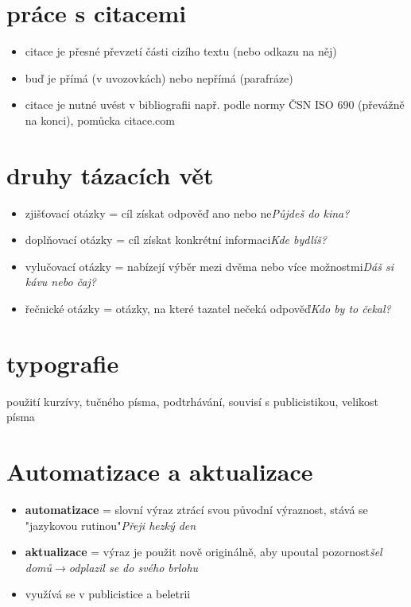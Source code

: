 \documentclass{memoir}
\begin{document}
\section*{práce s citacemi}
	\begin{itemize}
		\item citace je přesné převzetí části cizího textu (nebo odkazu na něj)
		\item buď je přímá (v uvozovkách) nebo nepřímá (parafráze)
		\item citace je nutné uvést v bibliografii např. podle normy ČSN ISO 690 (převážně na konci), pomůcka citace.com
	\end{itemize}

\section*{druhy tázacích vět}
	\begin{itemize}
		\item zjišťovací otázky = cíl získat odpověď ano nebo ne\hfill\textit{Půjdeš do kina?}
		\item doplňovací otázky = cíl získat konkrétní informaci\hfill\textit{Kde bydlíš?}
		\item vylučovací otázky = nabízejí výběr mezi dvěma nebo více možnostmi\hfill\textit{Dáš si kávu nebo čaj?}
		\item řečnické otázky = otázky, na které tazatel nečeká odpověď\hfill\textit{Kdo by to čekal?}
	\end{itemize}

\section*{typografie}
použití kurzívy, tučného písma, podtrhávání, souvisí s publicistikou, velikost písma

\section*{Automatizace a aktualizace}
	\begin{itemize}
		\item \textbf{automatizace} = slovní výraz ztrácí svou původní výraznost, stává se "jazykovou rutinou"\hfill\textit{Přeji hezký den}
		\item \textbf{aktualizace} = výraz je použit nově originálně, aby upoutal pozornost\hfill\textit{šel domů$\rightarrow$odplazil se do svého brlohu} 
		\item využívá se v publicistice a beletrii
	\end{itemize}
\end{document}
